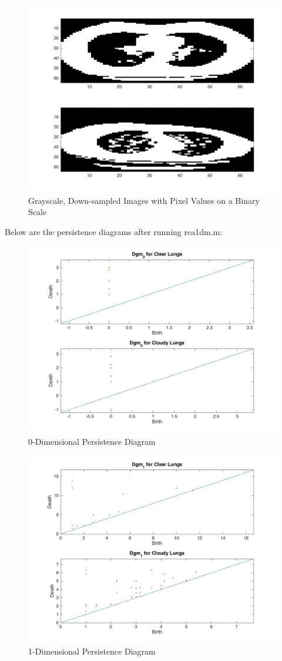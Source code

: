 \documentclass[12pt]{report}
\begin{document}
\begin{figure}[H]
\centering
	\includegraphics[width=0.8\linewidth]{tS2.jpg}
	\caption{Grayscale, Down-sampled Images with Pixel Values on a Binary Scale}
\end{figure}

Below are the persistence diagrams after running rca1dm.m:

\begin{figure}[H]
\centering
	\includegraphics[width=0.8\linewidth]{tSdgm0.jpg}
	\caption{0-Dimensional Persistence Diagram}
\end{figure}

\begin{figure}[H]
\centering
	\includegraphics[width=0.8\linewidth]{tSdgm1.jpg}
	\caption{1-Dimensional Persistence Diagram}
\end{figure}
\end{document}
